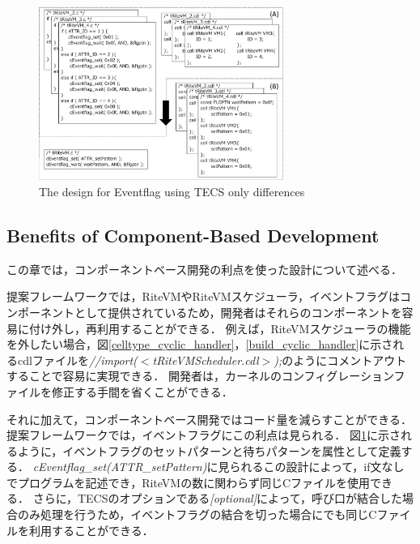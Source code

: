 \documentclass[submit]{ipsj_v2/UTF8/ipsj}
\begin{document}
\begin{figure}[t]
    \centering
    \includegraphics[width=8cm,clip]{../EMSOFT2016/figure/Eventflag.pdf}
    \caption{The design for Eventflag using TECS {\scriptsize *only differences}}
    \label{fig:Eventflag}
\end{figure}
 
\subsection{Benefits of Component-Based Development}
この章では，コンポーネントベース開発の利点を使った設計について述べる．

提案フレームワークでは，RiteVMやRiteVMスケジューラ，イベントフラグはコンポーネントとして提供されているため，開発者はそれらのコンポーネントを容易に付け外し，再利用することができる．
例えば，RiteVMスケジューラの機能を外したい場合，図\ref{celltype_cyclic_handler}，\ref{build_cyclic_handler}に示されるcdlファイルを{\it //import($<$tRiteVMScheduler.cdl$>$);}のようにコメントアウトすることで容易に実現できる．
開発者は，カーネルのコンフィグレーションファイルを修正する手間を省くことができる．

それに加えて，コンポーネントベース開発ではコード量を減らすことができる．
提案フレームワークでは，イベントフラグにこの利点は見られる．
図\ref{fig:Eventflag}に示されるように，イベントフラグのセットパターンと待ちパターンを属性として定義する．
{\it cEventflag\_set(ATTR\_setPattern)}に見られるこの設計によって，if文なしでプログラムを記述でき，RiteVMの数に関わらず同じCファイルを使用できる．
さらに，TECSのオプションである{\it [optional]}によって，呼び口が結合した場合のみ処理を行うため，イベントフラグの結合を切った場合にでも同じCファイルを利用することができる．
\end{document}
